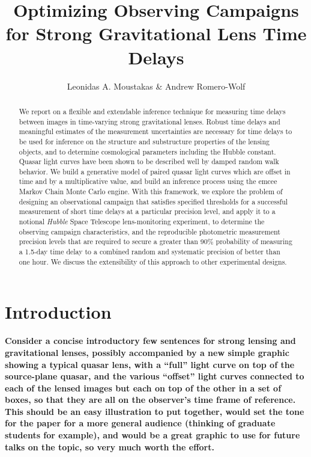 \documentclass{emulateapj}
\begin{document}
\title{Optimizing Observing Campaigns for Strong  Gravitational Lens Time Delays} 
\author{Leonidas A. Moustakas \& Andrew Romero-Wolf} 

\begin{abstract}
  We report on a flexible and extendable inference technique for
  measuring time delays between images in time-varying strong
  gravitational lenses.  Robust time delays and meaningful estimates
  of the measurement uncertainties are necessary for time delays to be
  used for inference on the structure and substructure properties of
  the lensing objects, and to determine cosmological parameters
  including the Hubble constant.  Quasar light curves have been shown
  to be described well by damped random walk behavior. We build a
  generative model of paired quasar light curves which are offset in
  time and by a multiplicative value, and build an inference process
  using the emcee Markov Chain Monte Carlo engine.  With this
  framework, we explore the problem of designing an observational
  campaign that satisfies specified thresholds for a successful
  measurement of short time delays at a particular precision level,
  and apply it to a notional \emph{Hubble} Space Telescope
  lens-monitoring experiment, to determine the observing campaign
  characteristics, and the reproducible photometric measurement
  precision levels that are required to secure a greater than 90\%
  probability of measuring a 1.5-day time delay to a combined random
  and systematic precision of better than one hour.  We discuss the
  extensibility of this approach to other experimental designs.
\end{abstract}
 

\section{Introduction}

{\bf Consider a concise introductory few sentences for strong lensing
  and gravitational lenses, possibly accompanied by a new simple
  graphic showing a typical quasar lens, with a ``full'' light curve
  on top of the source-plane quasar, and the various ``offset'' light
  curves connected to each of the lensed images but each on top of the
  other in a set of boxes, so that they are all on the observer's time
  frame of reference. This should be an easy illustration to put
  together, would set the tone for the paper for a more general
  audience (thinking of graduate students for example), and would be a
great graphic to use for future talks on the topic, so very much worth
the effort.} 
\end{document}
